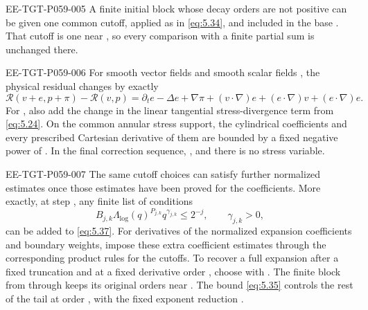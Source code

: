 \begin{EESegment}{EE-TGT-P059-005}
A finite initial block whose decay orders are not positive can be given one common cutoff, applied as in
\eqref{eq:5.34}, and included in the base . That cutoff is one near
, so every comparison with a finite partial sum is unchanged there.
\end{EESegment}

\begin{EESegment}{EE-TGT-P059-006}
For smooth vector fields  and smooth scalar fields , the physical
residual changes by exactly
\[
 \mathscr R(v+e,p+\pi)-\mathscr R(v,p)
 =\partial_te-\Delta e+\nabla\pi+(v\mathbin\cdot\nabla)e+(e\mathbin\cdot\nabla)v
 +(e\mathbin\cdot\nabla)e.
\]
For , also add the change in the linear tangential stress-divergence
term from \eqref{eq:5.24}. On the common annular stress support, the cylindrical coefficients and every prescribed
Cartesian derivative of them are bounded by a fixed negative power of . In the final correction
sequence, , and there is no stress variable.
\end{EESegment}

\begin{EESegment}{EE-TGT-P059-007}
The same cutoff choices can satisfy further normalized estimates once those estimates have been proved for the
coefficients. More exactly, at step , any finite list of conditions
\begin{equation}
 B_{j,k}\Lambda_{\log}(q)^{P_{j,k}}q^{\gamma_{j,k}}\leq2^{-j},
 \qquad \gamma_{j,k}>0,
 \tag{5.40}\label{eq:5.40}
\end{equation}
can be added to \eqref{eq:5.37}. For derivatives of the normalized expansion coefficients and boundary weights, impose
these extra coefficient estimates through the corresponding product rules for the cutoffs. To recover a full expansion
after a fixed truncation  and at a fixed derivative order , choose
 with . The finite block from
 through  keeps its original orders near
. The bound \eqref{eq:5.35} controls the rest of the tail at order
, with the fixed exponent reduction .
\end{EESegment}

